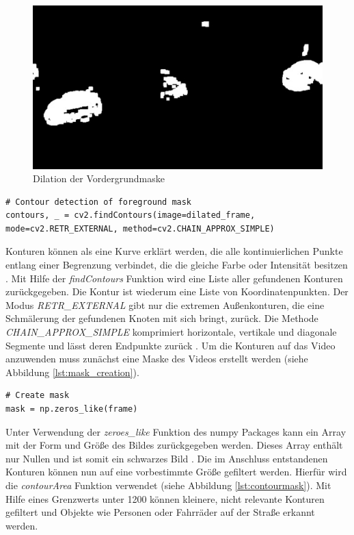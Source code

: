\begin{figure}[htb]
	\centering
	\includegraphics[width=.9\textwidth]{images/abbildung_dilation}
	\caption{Dilation der Vordergrundmaske}
	\label{fig:dilation_foreground_mask}
\end{figure}

\vspace*{10mm}
\begin{lstlisting}[caption={Finden aller Konturen in der Vordergrundmaske}, label={lst:foreground_dilation_detection}]
# Contour detection of foreground mask
contours, _ = cv2.findContours(image=dilated_frame, mode=cv2.RETR_EXTERNAL, method=cv2.CHAIN_APPROX_SIMPLE)
\end{lstlisting}

Konturen können als eine Kurve erklärt werden, die alle kontinuierlichen Punkte entlang einer Begrenzung verbindet, die die gleiche Farbe oder Intensität besitzen \cite{opencv_contour}. Mit Hilfe der \emph{findContours} Funktion wird eine Liste aller gefundenen Konturen zurückgegeben. Die Kontur ist wiederum eine Liste von Koordinatenpunkten. Der Modus \emph{RETR\_EXTERNAL} gibt nur die extremen Außenkonturen, die eine Schmälerung der gefundenen Knoten mit sich bringt, zurück. Die Methode \emph{CHAIN\_APPROX\_SIMPLE} komprimiert horizontale, vertikale und diagonale Segmente und lässt deren Endpunkte zurück \cite{openstruct}. Um die Konturen auf das Video anzuwenden muss zunächst eine Maske des Videos erstellt werden (siehe Abbildung \ref{lst:mask_creation}).

\vspace*{10mm}
\begin{lstlisting}[caption={Erstellung einer Maske des aktuellen Bildes}, label={lst:mask_creation}]
# Create mask
mask = np.zeros_like(frame)
\end{lstlisting}

Unter Verwendung der \emph{zeroes\_like} Funktion des numpy Packages kann ein Array mit der Form und Größe des Bildes zurückgegeben werden. Dieses Array enthält nur Nullen und ist somit ein schwarzes Bild \cite{numpyzeroeslike}.
Die im Anschluss entstandenen Konturen können nun auf eine vorbestimmte Größe gefiltert werden. Hierfür wird die \emph{contourArea} Funktion verwendet (siehe Abbildung \ref{lst:contourmask}). Mit Hilfe eines Grenzwerts unter 1200 können kleinere, nicht relevante Konturen gefiltert und Objekte wie Personen oder Fahrräder auf der Straße erkannt werden. 

